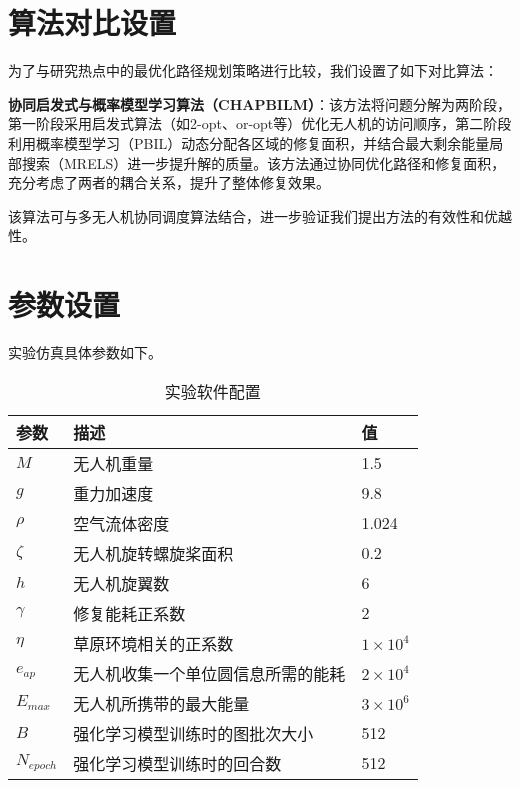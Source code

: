 \documentclass[AutoFakeBold]{LZUThesis}
\begin{document}
\section{算法对比设置}

为了与研究热点中的最优化路径规划策略\cite{aggarwal2020path}进行比较，我们设置了如下对比算法：

\textbf{协同启发式与概率模型学习算法（CHAPBILM）\cite{JIAO2024108084}}：该方法将问题分解为两阶段，第一阶段采用启发式算法（如2-opt、or-opt等）优化无人机的访问顺序，第二阶段利用概率模型学习（PBIL）动态分配各区域的修复面积，并结合最大剩余能量局部搜索（MRELS）进一步提升解的质量。该方法通过协同优化路径和修复面积，充分考虑了两者的耦合关系，提升了整体修复效果。

该算法可与多无人机协同调度算法结合，进一步验证我们提出方法的有效性和优越性。
\section{参数设置}
实验仿真具体参数如下。

\label{sub:无人机参数表格}
\begin{table}[H]
	\centering
	\caption{实验软件配置}
	\begin{tabular}{lll} %
		\toprule
		参数              & 描述                & 值                   \\
		\midrule
		\( M \)         & 无人机重量             & 1.5                 \\
		\( g \)         & 重力加速度             & 9.8                 \\
		\( \rho \)      & 空气流体密度            & 1.024               \\
		\( \zeta \)     & 无人机旋转螺旋桨面积        & 0.2                 \\
		\( h \)         & 无人机旋翼数            & 6                   \\
		\( \gamma \)    & 修复能耗正系数           & 2                   \\
		\( \eta \)      & 草原环境相关的正系数        & \( 1 \times 10^4 \) \\
		\( e_{ap} \)    & 无人机收集一个单位圆信息所需的能耗 & \( 2 \times 10^4 \) \\
		\( E_{max} \)   & 无人机所携带的最大能量       & \( 3 \times 10^6 \) \\
		\( B \)         & 强化学习模型训练时的图批次大小   & 512                 \\
		\( N_{epoch} \) & 强化学习模型训练时的回合数     & 512                 \\
		\bottomrule
	\end{tabular}
	\label{tbl_drone_parameters}
\end{table}
\end{document}
